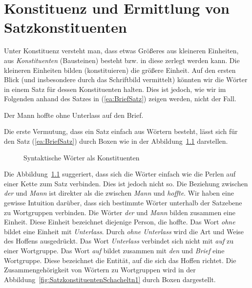 \chapter{Konstituenz und Ermittlung von Satzkonstituenten}\label{chap:Konstituenz}
 
Unter Konstituenz versteht man, dass etwas Größeres aus kleineren Einheiten, aus \textit{Konstituenten} (Bausteinen) besteht bzw. in diese zerlegt werden kann. Die kleineren Einheiten bilden (konstituieren) die größere Einheit. Auf den ersten Blick (und insbesondere durch das Schriftbild vermittelt) könnten wir die Wörter in einem Satz für dessen Konstituenten halten. Dies ist jedoch, wie wir im Folgenden anhand des Satzes in (\ref{ea:BriefSatz}) zeigen werden, nicht der Fall. 

\ea \label{ea:BriefSatz} Der Mann hoffte ohne Unterlass auf den Brief.
\z 


Die erste Vermutung, dass ein Satz einfach aus Wörtern besteht, lässt sich für den Satz (\ref{ea:BriefSatz}) durch Boxen wie in der Abbildung~\ref{fig:synt.WörterSchachteln} darstellen. 

\begin{figure}

\caption{\label{fig:synt.WörterSchachteln}Syntaktische Wörter als Konstituenten}
\end{figure}%

Die Abbildung~\ref{fig:synt.WörterSchachteln} suggeriert, dass sich die Wörter einfach wie die Perlen auf einer Kette zum Satz verbinden. Dies ist jedoch nicht so. Die Beziehung zwischen \textit{der} und \textit{Mann} ist direkter als die zwischen \textit{Mann} und \textit{hoffte}. Wir haben eine gewisse Intuition darüber, dass sich bestimmte Wörter unterhalb der Satzebene zu Wortgruppen verbinden. Die Wörter \textit{der} und \textit{Mann} bilden zusammen eine Einheit. Diese Einheit bezeichnet diejenige Person, die hoffte. Das Wort \textit{ohne} bildet eine Einheit mit \textit{Unterlass}. Durch \textit{ohne Unterlass} wird die Art und Weise des Hoffens ausgedrückt. Das Wort \textit{Unterlass} verbindet sich nicht mit \textit{auf} zu einer Wortgruppe. Das Wort \textit{auf} bildet zusammen mit \textit{den} und \textit{Brief} eine Wortgruppe. Diese bezeichnet die Entität, auf die sich das Hoffen richtet. Die Zusammengehörigkeit von Wörtern zu Wortgruppen wird in der Abbildung~\ref{fig:SatzkonstituentenSchacheltn1} durch Boxen dargestellt.    


